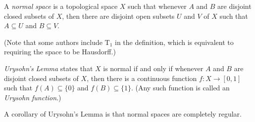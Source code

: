 \documentclass[12pt]{article}
\begin{document}

A \emph{normal space} is a topological space $X$
such that whenever $A$ and $B$ are disjoint closed subsets of $X$,
then there are disjoint open subsets $U$ and $V$ of $X$
such that $A\subseteq U$ and $B\subseteq V$.

(Note that some authors include $\mathrm{T}_1$ in the definition,
which is equivalent to requiring the space to be Hausdorff.)

\emph{Urysohn's Lemma} states that $X$ is normal
if and only if
whenever $A$ and $B$ are disjoint closed subsets of $X$,
then there is a continuous function $f\colon X\to[0,1]$
such that $f(A)\subseteq\{0\}$ and $f(B)\subseteq\{1\}$.
(Any such function is called an \emph{Urysohn function}.)

A corollary of Urysohn's Lemma
is that normal  spaces are completely regular.
\end{document}
